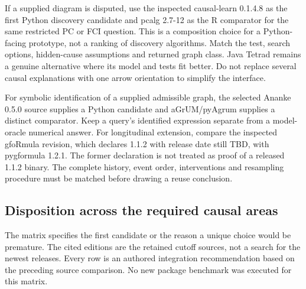 If a supplied diagram is disputed, use the inspected causal-learn 0.1.4.8
as the first Python discovery candidate and pcalg 2.7-12 as the R comparator
for the same restricted PC or FCI question. This is a composition choice
for a Python-facing prototype, not a ranking of discovery algorithms.
Match the test, search options, hidden-cause assumptions and returned graph
class. Java Tetrad remains a genuine alternative where its model and tests
fit better. Do not replace several causal explanations with one arrow
orientation to simplify the interface.
\citep{v12_sw_causallearn,exec13_pcalg_reuse_primary,exec13_java_tetrad}

For symbolic identification of a supplied admissible graph, the selected
Ananke 0.5.0 source supplies a Python candidate and aGrUM/pyAgrum supplies
a distinct comparator. Keep a query's identified expression separate from
a model-oracle numerical answer. For longitudinal extension, compare the
inspected gfoRmula revision, which declares 1.1.2 with release date still
TBD, with pygformula 1.2.1. The former declaration is not treated as proof
of a released 1.1.2 binary. The complete history, event order, interventions
and resampling procedure must be matched before drawing a reuse conclusion.
\citep{exec24_ananke_source,exec19_cxx_identification_source,
exec24_agrum_source,exec20_gformula_reuse,exec24_longpy_pygformula_source}

\subsection{Disposition across the required causal areas}
The matrix specifies the first candidate or the reason a unique choice
would be premature. The cited editions are the retained cutoff sources,
not a search for the newest releases. Every row is an authored integration
recommendation based on the preceding source comparison. No new package
benchmark was executed for this matrix.

